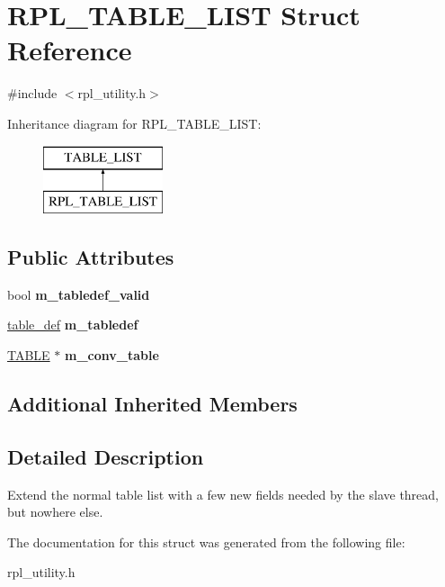 \hypertarget{structRPL__TABLE__LIST}{}\section{R\+P\+L\+\_\+\+T\+A\+B\+L\+E\+\_\+\+L\+I\+ST Struct Reference}
\label{structRPL__TABLE__LIST}


{\ttfamily \#include $<$rpl\+\_\+utility.\+h$>$}

Inheritance diagram for R\+P\+L\+\_\+\+T\+A\+B\+L\+E\+\_\+\+L\+I\+ST\+:\begin{figure}[H]
\begin{center}
\leavevmode
\includegraphics[height=2.000000cm]{structRPL__TABLE__LIST}
\end{center}
\end{figure}
\subsection*{Public Attributes}
\begin{DoxyCompactItemize}
\item 
\mbox{\label{structRPL__TABLE__LIST_a9e17624e11f172298ed6107ae1df0c46}} 
bool {\bfseries m\+\_\+tabledef\+\_\+valid}
\item 
\mbox{\label{structRPL__TABLE__LIST_a45707f231a1f4c06293818728ef4e89d}} 
\mbox{\hyperlink{classtable__def}{table\+\_\+def}} {\bfseries m\+\_\+tabledef}
\item 
\mbox{\label{structRPL__TABLE__LIST_aa7fefa2e30ad80a70bec31b2a222f5b3}} 
\mbox{\hyperlink{structTABLE}{T\+A\+B\+LE}} $\ast$ {\bfseries m\+\_\+conv\+\_\+table}
\end{DoxyCompactItemize}
\subsection*{Additional Inherited Members}


\subsection{Detailed Description}
Extend the normal table list with a few new fields needed by the slave thread, but nowhere else. 

The documentation for this struct was generated from the following file\+:\begin{DoxyCompactItemize}
\item 
rpl\+\_\+utility.\+h\end{DoxyCompactItemize}
